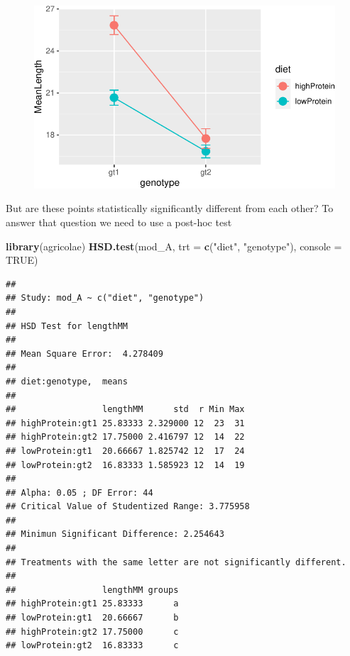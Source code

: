 \documentclass[
  a4paperpaper,
]{book}
\newenvironment{Shaded}{\begin{snugshade}}{\end{snugshade}}
\newcommand{\DataTypeTok}[1]{\textcolor[rgb]{0.13,0.29,0.53}{#1}}
\newcommand{\KeywordTok}[1]{\textcolor[rgb]{0.13,0.29,0.53}{\textbf{#1}}}
\newcommand{\NormalTok}[1]{#1}
\newcommand{\OtherTok}[1]{\textcolor[rgb]{0.56,0.35,0.01}{#1}}
\newcommand{\StringTok}[1]{\textcolor[rgb]{0.31,0.60,0.02}{#1}}
\begin{document}
\begin{figure}[ht]

{\centering \includegraphics{BB852_files/figure-latex/errorBars-1} 

}

\end{figure}

But are these points statistically significantly different from each other?
To answer that question we need to use a post-hoc test

\begin{Shaded}
\begin{Highlighting}[]
\KeywordTok{library}\NormalTok{(agricolae)}
\KeywordTok{HSD.test}\NormalTok{(mod\_A, }\DataTypeTok{trt =} \KeywordTok{c}\NormalTok{(}\StringTok{"diet"}\NormalTok{, }\StringTok{"genotype"}\NormalTok{), }\DataTypeTok{console =} \OtherTok{TRUE}\NormalTok{)}
\end{Highlighting}
\end{Shaded}

\begin{verbatim}
## 
## Study: mod_A ~ c("diet", "genotype")
## 
## HSD Test for lengthMM 
## 
## Mean Square Error:  4.278409 
## 
## diet:genotype,  means
## 
##                 lengthMM      std  r Min Max
## highProtein:gt1 25.83333 2.329000 12  23  31
## highProtein:gt2 17.75000 2.416797 12  14  22
## lowProtein:gt1  20.66667 1.825742 12  17  24
## lowProtein:gt2  16.83333 1.585923 12  14  19
## 
## Alpha: 0.05 ; DF Error: 44 
## Critical Value of Studentized Range: 3.775958 
## 
## Minimun Significant Difference: 2.254643 
## 
## Treatments with the same letter are not significantly different.
## 
##                 lengthMM groups
## highProtein:gt1 25.83333      a
## lowProtein:gt1  20.66667      b
## highProtein:gt2 17.75000      c
## lowProtein:gt2  16.83333      c
\end{verbatim}
\end{document}
